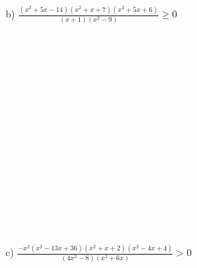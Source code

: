\documentclass[a4paper,14pt]{article}
\begin{document}
    
    			b) $\frac{(x^2 + 5x - 14)(x^2 + x + 7)(x^2 + 5x + 6)}{(x+ 1)(x^2 - 9)} \geq 0$ \\\\\\\\\\\\\\\\\\\\\\\\\\\\\\\\\\
    			c) $\frac{-x^2(x^2 - 13x + 36)(x^2 + x + 2)(x^2 - 4x + 4)}{(4x^2 - 8)(x^2 + 6x)} > 0$ \newpage
\end{document}
